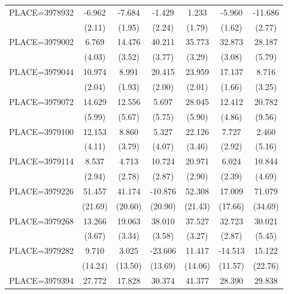 {\begin{tabular}{l*{6}{c}}
PLACE=3978932       &      -6.962&      -7.684&      -1.429&       1.233&      -5.960&     -11.686\\
                    &      (2.11)&      (1.95)&      (2.24)&      (1.79)&      (1.62)&      (2.77)\\
PLACE=3979002       &       6.769&      14.476&      40.211&      35.773&      32.873&      28.187\\
                    &      (4.03)&      (3.52)&      (3.77)&      (3.29)&      (3.08)&      (5.79)\\
PLACE=3979044       &      10.974&       8.991&      20.415&      23.959&      17.137&       8.716\\
                    &      (2.04)&      (1.93)&      (2.00)&      (2.01)&      (1.66)&      (3.25)\\
PLACE=3979072       &      14.629&      12.556&       5.697&      28.045&      12.412&      20.782\\
                    &      (5.99)&      (5.67)&      (5.75)&      (5.90)&      (4.86)&      (9.56)\\
PLACE=3979100       &      12.153&       8.860&       5.327&      22.126&       7.727&       2.460\\
                    &      (4.11)&      (3.79)&      (4.07)&      (3.46)&      (2.92)&      (5.16)\\
PLACE=3979114       &       8.537&       4.713&      10.724&      20.971&       6.024&      10.844\\
                    &      (2.94)&      (2.78)&      (2.87)&      (2.90)&      (2.39)&      (4.69)\\
PLACE=3979226       &      51.457&      41.174&     -10.876&      52.308&      17.009&      71.079\\
                    &     (21.69)&     (20.60)&     (20.90)&     (21.43)&     (17.66)&     (34.69)\\
PLACE=3979268       &      13.266&      19.063&      38.010&      37.527&      32.723&      30.021\\
                    &      (3.67)&      (3.34)&      (3.58)&      (3.27)&      (2.87)&      (5.45)\\
PLACE=3979282       &       9.710&       3.025&     -23.606&      11.417&     -14.513&      15.122\\
                    &     (14.24)&     (13.50)&     (13.69)&     (14.06)&     (11.57)&     (22.76)\\
PLACE=3979394       &      27.772&      17.828&      30.374&      41.377&      28.390&      29.838\\

\end{tabular}}
